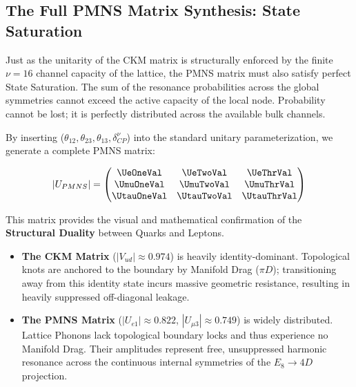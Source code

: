 \subsection{The Full PMNS Matrix Synthesis: State Saturation}

Just as the unitarity of the CKM matrix is structurally enforced by the finite $\nu=16$ channel capacity of the lattice, the PMNS matrix must also satisfy perfect State Saturation. The sum of the resonance probabilities across the global symmetries cannot exceed the active capacity of the local node. Probability cannot be lost; it is perfectly distributed across the available bulk channels.

By inserting ($\theta_{12}, \theta_{23}, \theta_{13}, \delta_{CP}^\nu$) into the standard unitary parameterization, we generate a complete PMNS matrix:

\begin{equation}
|U_{PMNS}| =
\begin{pmatrix}
\mathbf{\UeOneVal} & \mathbf{\UeTwoVal} & \mathbf{\UeThrVal} \\
\mathbf{\UmuOneVal} & \mathbf{\UmuTwoVal} & \mathbf{\UmuThrVal} \\
\mathbf{\UtauOneVal} & \mathbf{\UtauTwoVal} & \mathbf{\UtauThrVal}
\end{pmatrix}
\end{equation}

This matrix provides the visual and mathematical confirmation of the \textbf{Structural Duality} between Quarks and Leptons. 
\begin{itemize}
    \item \textbf{The CKM Matrix} ($|V_{ud}| \approx 0.974$) is heavily identity-dominant. Topological knots are anchored to the boundary by Manifold Drag ($\pi D$); transitioning away from this identity state incurs massive geometric resistance, resulting in heavily suppressed off-diagonal leakage.
    \item \textbf{The PMNS Matrix} ($|U_{e1}| \approx 0.822$, $|U_{\mu3}| \approx 0.749$) is widely distributed. Lattice Phonons lack topological boundary locks and thus experience no Manifold Drag. Their amplitudes represent free, unsuppressed harmonic resonance across the continuous internal symmetries of the $E_8 \to 4D$ projection.
\end{itemize}